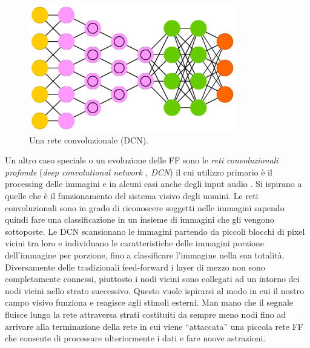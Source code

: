 \begin{figure}
\includegraphics[scale=0.7]{media_tesi/DCN.png}
\caption{Una rete convoluzionale (DCN).}\label{wrap-fig:1}
\end{figure} 
Un altro caso speciale o un evoluzione delle FF sono le \textit{reti convoluzionali profonde} (\textit{deep convolutional network , DCN}) il cui utilizzo primario è il processing delle immagini e in alcuni casi anche degli input audio \cite{lecun1998gradient}. Si ispirano a quelle che è il funzionamento del sistema visivo degli uomini.
Le reti convoluzionali sono in grado di riconoscere soggetti nelle immagini sapendo quindi fare una classificazione in un insieme di immagini che gli vengono sottoposte. Le DCN scansionano le immagini partendo da piccoli blocchi di pixel vicini tra loro e individuano le caratteristiche delle immagini porzione dell'immagine per porzione, fino a classificare l'immagine nella sua totalità.
Diversamente delle tradizionali feed-forward i layer di mezzo non sono completamente connessi, piuttosto i nodi vicini sono collegati ad un intorno dei nodi vicini nello strato successivo. Questo vuole ispirarsi al modo in cui il nostro campo visivo funziona e reagisce agli stimoli esterni. Man mano che il segnale fluisce lungo la rete attraversa strati costituiti da sempre meno nodi fino ad arrivare alla terminazione della rete in cui viene ``attaccata'' una piccola rete FF che consente di processare ulteriormente i dati e fare nuove astrazioni.

